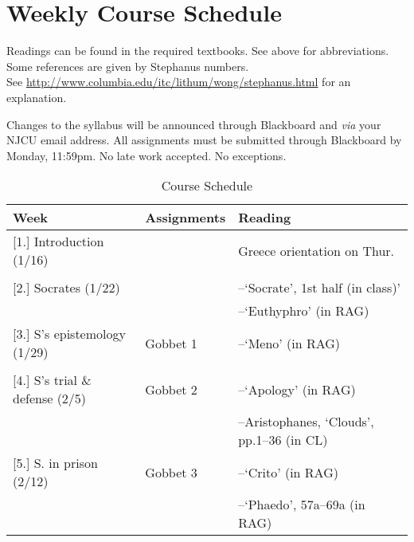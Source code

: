 \documentclass[article,oneside]{memoir}
\begin{document}
\section{Weekly Course Schedule}
Readings can be found in the required textbooks. See above for abbreviations. Some references are given by Stephanus numbers.\\ See \href{http://www.columbia.edu/itc/lithum/wong/stephanus.html}{http://www.columbia.edu/itc/lithum/wong/stephanus.html} for an explanation. 

 Changes to the syllabus will be announced through Blackboard and \emph{via} your NJCU email address.  All assignments must be submitted through Blackboard by Monday, 11:59pm. No late work accepted. No exceptions.   \newline

\begin{center}
\begin{longtable}{p{4.5cm}p{2cm}p{6cm}}
 
  \caption{Course Schedule} \\
  \toprule
  \textbf{Week} &\textbf{Assignments} & \textbf{Reading} \\
  \midrule

  

[1.] Introduction	(1/16)	  			& 	 			& Greece orientation on Thur.  \\ 
								&		  		&    \\ [1.8\baselineskip]

[2.] Socrates (1/22)					& 				& --`Socrate', 1st half (in class)' \\
			        					&			  	& --`Euthyphro'  (in RAG) \\  [1.8\baselineskip]
	
[3.] S's epistemology  (1/29)				& Gobbet 1		&  --`Meno' (in RAG) \\
			       					&		  		&   \\[1.8\baselineskip]


[4.] S's trial \& defense (2/5)				& Gobbet 2		& --`Apology' (in RAG) \\
			     				   	& 			    	& --Aristophanes, `Clouds', pp.1--36 (in CL) \\ [1.8\baselineskip]

[5.] S. in prison (2/12)	& Gobbet 3		 & --`Crito' (in RAG)\\
								& 			    	&  --`Phaedo', 57a--69a (in RAG)\\ [1.8\baselineskip]




\end{longtable}
\end{center}
\end{document}
